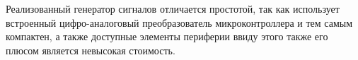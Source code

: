 \documentclass[14pt, oneside]{altsu-bachelor}
\begin{document}
	Реализованный генератор сигналов отличается простотой, так как использует встроенный цифро-аналоговый преобразователь микроконтроллера и тем самым компактен, а также доступные элементы периферии ввиду этого также его плюсом является невысокая стоимость. 




\newpage
{}
\printbibliography[title={СПИСОК ИСПОЛЬЗОВАННОЙ ЛИТЕРАТУРЫ}]



\makelastpage
\end{document}
